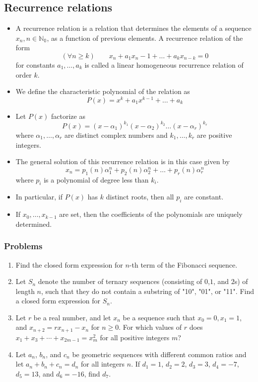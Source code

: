 \documentclass{article}
\begin{document}
	\subsection{Recurrence relations} %
		\begin{itemize}
			\item 
			A recurrence relation is a relation that determines the elements of a sequence $x_n, n \in \mathbb{N_0}$, as a function of previous elements. A recurrence relation of the form
			$$(\forall n \geq k) \hspace{2em} x_n + a_1x_n-1 + \hdots + a_kx_{n-k} = 0$$
			for constants $a_1, \hdots, a_k$ is called a linear homogeneous recurrence relation of order $k$.
			\item	
			We define the characteristic polynomial of the relation as 
			$$P(x) = x^k + a_1x^{k-1} + \hdots + a_k$$
			\item
			Let $P(x)$	factorize as 
			$$P(x) = (x-\alpha_1)^{k_1}(x-\alpha_2)^{k_2} \hdots (x-\alpha_r)^{k_r}$$
			where $\alpha_1, \hdots , \alpha_r$ are distinct complex numbers and $k_1, \hdots, k_r$ are positive integers. 
			\item 
			The general solution of this recurrence relation is in this case given by
			$$x_n = p_1(n)\alpha_1^n + p_2(n)\alpha_2^n + \hdots + p_r(n)\alpha_r^n$$
			where $p_i$ is a polynomial of degree less than $k_i$.
			\item
			In particular, if $P(x)$ has $k$
			distinct roots, then all $p_i$ are constant.
			\item 
			If $x_0, \hdots, x_{k-1}$ are set, then the coefficients of the polynomials are uniquely determined.
		\end{itemize}
			
			\subsubsection*{Problems}
			\begin{enumerate}
				\item 
				Find the closed form expression for $n$-th term of the Fibonacci sequence.
				\item
				Let $S_n$ denote the number of ternary sequences (consisting of $0$,$1$, and $2$s) of length $n$, such that they do not contain a substring of "10", "01", or "11". Find a closed form expression for $S_n$.
				\item
				Let $r$ be a real number, and let $x_n$ be a sequence such that $x_0 = 0, x_1 = 1$, and $x_{n+2} = rx_{n+1} - x_n$ for $n \ge 0$. For which values of $r$ does $x_1 + x_3 + \cdots + x_{2m-1} = x_m^2$ for all positive integers $m$?
				\item
				Let $a_{n}$, $b_{n}$, and $c_{n}$ be geometric sequences with different common ratios and let $a_{n}+b_{n}+c_{n}=d_{n}$ for all integers $n$. If $d_{1}=1$, $d_{2}=2$, $d_{3}=3$, $d_{4}=-7$, $d_{5}=13$, and $d_{6}=-16$, find $d_{7}$.
			\end{enumerate}
\end{document}
